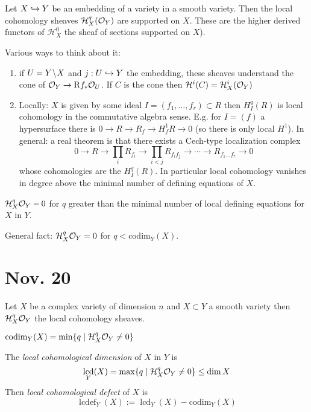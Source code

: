 \documentclass[12pt]{article}
\newcommand{\R}{\mathrm{R}}
\renewcommand{\cH}{\mathcal{H}}
\renewcommand{\codim}{\mathrm{codim}}
\DeclareMathOperator{\lcdef}{\mathrm{lcdef}}
\DeclareMathOperator{\lcd}{\mathrm{lcd}}
\begin{document}
\begin{defn}
Let $X \hookrightarrow Y$ be an embedding of a variety in a smooth variety. Then the local cohomology sheaves $\cH^q_X(\struct{Y})$ are supported on $X$. These are the higher derived functors of $\cH_X^0$ the sheaf of sections supported on $X$).
\end{defn}

Various ways to think about it:

\begin{enumerate}
\item if $U = Y \! \setminus \! X$ and $j : U \hookrightarrow Y$ the embedding, these sheaves understand the cone of $\struct{Y} \to \R f_* \struct{U}$. If $C$ is the cone then $\cH^i(C) = \cH^i_X(\struct{Y})$

\item Locally: $X$ is given by some ideal $I = (f_1, \dots, f_r) \subset R$ then $H^q_I(R)$ is local cohomology in the commutative algebra sense. E.g. for $I = (f)$ a hypersurface there is $0 \to R \to R_f \to H^1_f R \to 0$ (so there is only local $H^1$). In general: a real theorem is that there exists a Cech-type localization complex
\[ 0 \to R \to \prod_i R_{f_i} \to \prod_{i < j} R_{f_i f_j} \to \cdots \to R_{f_1 \dots f_r} \to 0 \]
whose cohomologies are the $H^q_I(R)$. In particular local cohomology vanishes in degree above the minimal number of defining equations of $X$. 
\end{enumerate}

\begin{cor}
$\cH^q_X \struct{Y} - 0$ for $q$ greater than the minimal number of local defining equations for $X$ in $Y$.
\end{cor}

General fact: $\cH^q_X \struct{Y} = 0$ for $q < \codim_Y(X)$. 

\section{Nov. 20}

Let $X$ be a complex variety of dimension $n$ and $X \subset Y$ a smooth variety then $\cH^q_X \struct{Y}$ the local cohomology sheaves. 

\begin{prop}
$\codim_Y(X) = \min \{ q \mid \cH_X^q \struct{Y} \neq 0 \}$
\end{prop}


\begin{defn}
The \textit{local cohomological dimension} of $X$ in $Y$ is 
\[ \lcd_Y(X) = \max \{ q \mid \cH_X^q \struct{Y} \neq 0 \} \le \dim{X} \]
Then \textit{local cohomological defect} of $X$ is 
\[ \lcdef_Y(X) := \lcd_Y(X) - \codim_Y(X) \]
\end{defn}
\end{document}
